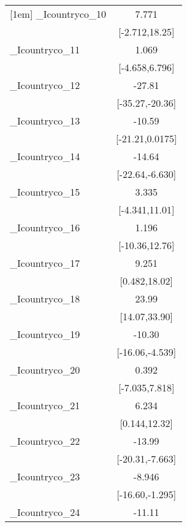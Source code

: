 {\begin{tabular}{l*{1}{c}}
[1em]
\_Icountryco\_10&                 7.771         \\
            &        [-2.712,18.25]         \\
[1em]
\_Icountryco\_11&                 1.069         \\
            &        [-4.658,6.796]         \\
[1em]
\_Icountryco\_12&                -27.81\sym{***}\\
            &       [-35.27,-20.36]         \\
[1em]
\_Icountryco\_13&                -10.59         \\
            &       [-21.21,0.0175]         \\
[1em]
\_Icountryco\_14&                -14.64\sym{***}\\
            &       [-22.64,-6.630]         \\
[1em]
\_Icountryco\_15&                 3.335         \\
            &        [-4.341,11.01]         \\
[1em]
\_Icountryco\_16&                 1.196         \\
            &        [-10.36,12.76]         \\
[1em]
\_Icountryco\_17&                 9.251\sym{*}  \\
            &         [0.482,18.02]         \\
[1em]
\_Icountryco\_18&                 23.99\sym{***}\\
            &         [14.07,33.90]         \\
[1em]
\_Icountryco\_19&                -10.30\sym{***}\\
            &       [-16.06,-4.539]         \\
[1em]
\_Icountryco\_20&                 0.392         \\
            &        [-7.035,7.818]         \\
[1em]
\_Icountryco\_21&                 6.234\sym{*}  \\
            &         [0.144,12.32]         \\
[1em]
\_Icountryco\_22&                -13.99\sym{***}\\
            &       [-20.31,-7.663]         \\
[1em]
\_Icountryco\_23&                -8.946\sym{*}  \\
            &       [-16.60,-1.295]         \\
[1em]
\_Icountryco\_24&                -11.11\sym{**} \\

\end{tabular}}
